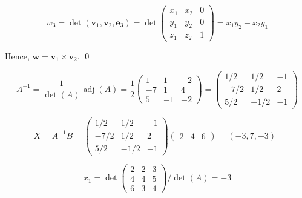 \documentclass[12pt]{article}
\begin{document}
\begin{equation}
    w_{3} = \det(\mathbf{v}_{1}, \mathbf{v}_{2}, \mathbf{e}_{3}) = \det \begin{pmatrix}
        x_{1} & x_{2} & 0 \\
        y_{1} & y_{2} & 0 \\
        z_{1} & z_{2} & 1
    \end{pmatrix} = x_{1}y_{2} - x_{2}y_{1}
\end{equation}

Hence, $\mathbf{w} = \mathbf{v}_{1} \times \mathbf{v}_{2}$.
\qed




\begin{equation}
    A^{-1} = \frac{1}{\det(A)} \operatorname{adj}(A)
    =
    \frac{1}{2} \begin{pmatrix}
        1  & 1  & -2 \\
        -7 & 1  & 4  \\
        5  & -1 & -2
    \end{pmatrix}
    =
    \begin{pmatrix}
        1/2  & 1/2  & -1 \\
        -7/2 & 1/2  & 2  \\
        5/2  & -1/2 & -1
    \end{pmatrix}
\end{equation}

\begin{equation}
    X = A^{-1} B
    =
    \begin{pmatrix}
        1/2  & 1/2  & -1 \\
        -7/2 & 1/2  & 2  \\
        5/2  & -1/2 & -1
    \end{pmatrix}
    \begin{pmatrix}
        2 & 4 & 6
    \end{pmatrix}
    =
    (-3 , 7, -3)^{\intercal}
\end{equation}


\begin{equation}
    x_{1}
    =
    \det \begin{pmatrix}
        2 & 2 & 3 \\
        4 & 4 & 5 \\
        6 & 3 & 4
    \end{pmatrix} / \det(A)
    = -3
\end{equation}
\end{document}
